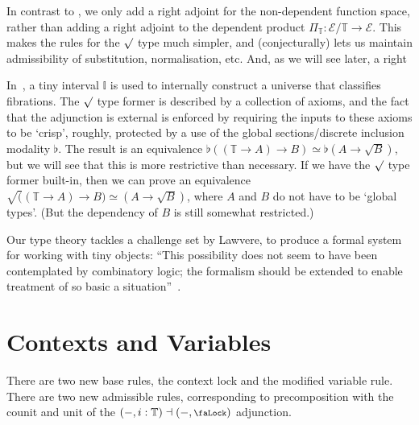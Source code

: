 \documentclass[10pt]{article} \usepackage{fullpage}
\theoremstyle{definition}
\renewcommand{\equiv}{\simeq}
\newcommand{\lock}{\mathchoice {\scalebox{0.8}{\text{\faLock}}}
  {\scalebox{0.8}{\text{\faLock}}} {\scalebox{0.5}{\text{\faLock}}}
  {\scalebox{0.4}{\text{\faLock}}} }
\newcommand{\Tiny}{\mathbb{T}}
\newcommand{\rformu}[1]{\surd #1}
\begin{document}
In contrast to
\cite[Section 2]{transpension}, we only add a right adjoint for the
non-dependent function space, rather than adding a right adjoint to the
dependent product $\Pi_\Tiny : \mathcal{E}/\Tiny \to
\mathcal{E}$. This makes the rules for the $\rformu$ type much
simpler, and (conjecturally) lets us maintain admissibility of
substitution, normalisation, etc. And, as we will see later, a right

In~\cite{lops}, a tiny interval $\mathbb{I}$ is used to internally
construct a universe that classifies fibrations. The $\rformu$ type
former is described by a collection of axioms, and the fact that the
adjunction is external is enforced by requiring the inputs to these
axioms to be `crisp', roughly, protected by a use of the global
sections/discrete inclusion modality $\flat$. The result is an
equivalence
$\flat((\Tiny \to A) \to B) \equiv \flat(A \to \rformu B)$, but we
will see that this is more restrictive than necessary. If we have the
$\rformu$ type former built-in, then we can prove an equivalence
$\rformu ((\Tiny \to A) \to B) \equiv (A \to \rformu B)$, where $A$
and $B$ do not have to be `global types'. (But the dependency of $B$
is still somewhat restricted.)

Our type theory tackles a challenge set by Lawvere, to produce a
formal system for working with tiny objects: ``This possibility does
not seem to have been contemplated by combinatory logic; the formalism
should be extended to enable treatment of so basic a
situation''~\cite[Section 3]{lawvere:adjoints}.


\section{Contexts and Variables}

There are two new base rules, the context lock and the modified
variable rule. There are two new admissible rules, corresponding to
precomposition with the counit and unit of the
$(-,i:\Tiny) \dashv (-,\lock)$ adjunction.
\end{document}
